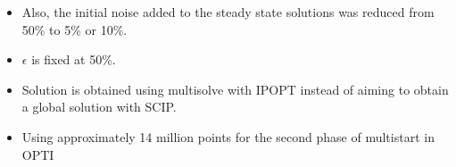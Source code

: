 \documentclass[10pt]{report}
\begin{document}
	\begin{itemize}
		\item Also, the initial noise added to the steady state solutions was reduced from 50\% to 5\% or 10\%.
		\item $\epsilon$ is fixed at 50\%.
		\item Solution is obtained using multisolve with IPOPT instead of aiming to obtain a global solution with SCIP.
		\item Using approximately 14 million points for the second phase of multistart in OPTI
	\end{itemize}
	
\end{document}
